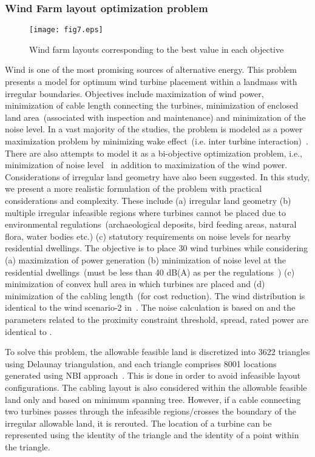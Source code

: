 \subsubsection{Wind Farm layout optimization problem}


\begin{figure*}[!htb]
	\centering
	\texttt{[image: fig7.eps]}
	\caption{Wind farm layouts corresponding to the best value in each objective} 
	\label{fig:layouts}
\end{figure*}

Wind is one of the most promising sources of alternative energy. This problem presents a model for optimum wind turbine placement within a landmass with irregular boundaries. Objectives include maximization of wind power, minimization of cable length connecting the turbines, minimization of enclosed land area~(associated with inspection and maintenance) and minimization of the noise level. In a vast majority of the studies, the problem is modeled as a power maximization problem by minimizing wake effect~(i.e. inter turbine interaction)~\cite{kusiak2010wind,chowdhury2012uwflo,turner2014mp}. There are also attempts to model it as a bi-objective optimization problem, i.e., minimization of noise level~\cite{tran2013mowind,kwong2014mo,sorkhabi2016mo} in addition to maximization of the wind power. Considerations of irregular land geometry have also been suggested\cite{gu2013irre,song2013terr}. In this study, we present a more realistic formulation of the problem with practical considerations and complexity. These include (a) irregular land geometry (b) multiple irregular infeasible regions where turbines cannot be placed due to environmental regulations~(archaeological deposits, bird feeding areas, natural flora, water bodies etc.) (c) statutory requirements on noise levels for nearby residential dwellings. The objective is to place 30 wind turbines while considering (a) maximization of power generation (b) minimization of noise level at the residential dwellings~(must be less than 40 dB(A) as per the regulations~\cite{SPA2009}) (c) minimization of convex hull area in which turbines are placed and (d) minimization of the cabling length~(for cost reduction). The wind distribution is identical to the wind scenario-2 in~\cite{kusiak2010wind}. The noise calculation is based on \cite{isonoise,kwong2014mo,stdaus2010,sorkhabi2016mo} and the parameters related to the proximity constraint threshold, spread, rated power are identical to \cite{kusiak2010wind}.  


To solve this problem, the allowable feasible land is discretized into 3622 triangles using Delaunay triangulation, and each triangle comprises 8001 locations generated using NBI approach~\cite{das1998normal}. This is done in order to avoid infeasible layout configurations. The cabling layout is also considered within the allowable feasible land only and based on minimum spanning tree. However, if a cable connecting two turbines passes through the infeasible regions/crosses the boundary of the irregular allowable land, it is rerouted. The location of a turbine can be represented using the identity of the triangle and the identity of a point within the triangle.

